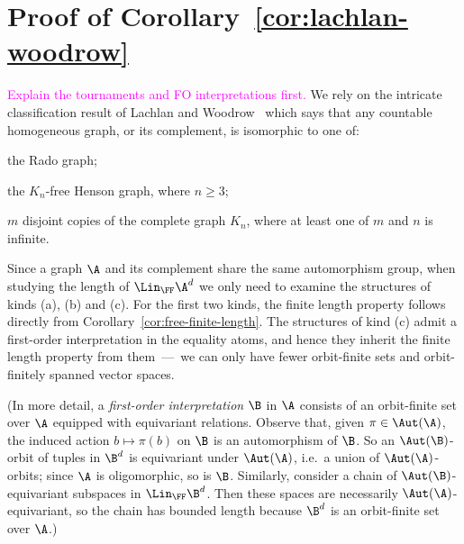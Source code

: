 \section{Proof of Corollary~\ref{cor:lachlan-woodrow}}
\textcolor{magenta}{Explain the tournaments and FO interpretations first.}
    We rely on the intricate classification result of Lachlan and Woodrow~\cite{LachlanWoodrow_80} which says that any countable homogeneous graph, or its complement, is isomorphic to one of: 
    \begin{romanenumerate}
        \item the Rado graph;
        \item the $K_n$-free Henson graph, where $n \geq 3$;
        \item $m$ disjoint copies of the complete graph $K_n$, where at least one of $m$ and $n$ is infinite.
    \end{romanenumerate}
    Since a graph $\A$ and its complement share the same automorphism group, 
    when studying the length of $\Lin_\FF \A^d$ we only need to examine the structures of kinds (a), (b) and (c). 
    For the first two kinds, the finite length property follows directly from Corollary~\ref{cor:free-finite-length}. 
    The structures of kind (c) admit a first-order interpretation in the equality atoms, 
    and hence they inherit the finite length property from them~---~we can only have fewer orbit-finite sets and orbit-finitely spanned vector spaces.
    
    (In more detail, a \emph{first-order interpretation} $\B$ in $\A$ consists of an orbit-finite set over $\A$ equipped with equivariant relations.
    Observe that, given $\pi \in \Aut(\A)$, the induced action $b \mapsto \pi(b)$ on $\B$ is an automorphism of $\B$.
    So an $\Aut(\B)$-orbit of tuples in $\B^d$ is equivariant under $\Aut(\A)$, i.e.~a union of $\Aut(\A)$-orbits;
    since $\A$ is oligomorphic, so is $\B$.
    Similarly, consider a chain of $\Aut(\B)$-equivariant subspaces in $\Lin_\FF \B^d$.
    Then these spaces are necessarily $\Aut(\A)$-equivariant, 
    so the chain has bounded length because $\B^d$ is an orbit-finite set over $\A$.)
